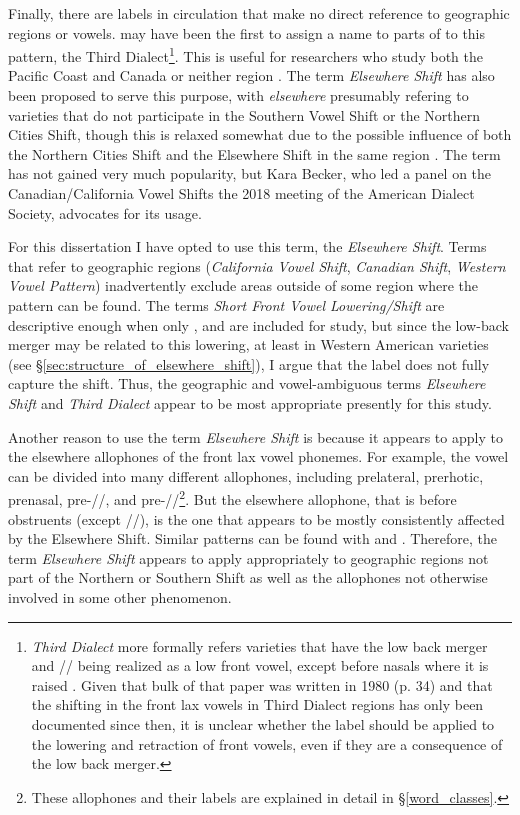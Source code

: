 Finally, there are labels in circulation that make no direct reference to geographic regions or vowels. \citet{labov_1991} may have been the first to assign a name to parts of to this pattern, the Third Dialect\footnote{\textit{Third Dialect} more formally refers varieties that have the low back merger and /\textipa{\ae}/ being realized as a low front vowel, except before nasals where it is raised \citep[30]{labov_1991}. Given that bulk of that paper was written in 1980 (p. 34) and that the shifting in the front lax vowels in Third Dialect regions has only been documented since then, it is unclear whether the label should be applied to the lowering and retraction of front vowels, even if they are a consequence of the low back merger.}. This is useful for researchers who study both the Pacific Coast and Canada \citep{swan_2018} or neither region \citep{durian_2012_diss}. The term \textit{Elsewhere Shift} has also been proposed to serve this purpose, with \textit{elsewhere} presumably refering to varieties that do not participate in the Southern Vowel Shift or the Northern Cities Shift, though this is relaxed somewhat due to the possible influence of both the Northern Cities Shift and the Elsewhere Shift in the same region \citep{mason_2018}. The term has not gained very much popularity, but Kara Becker, who led a panel on the Canadian/California Vowel Shifts the 2018 meeting of the American Dialect Society, advocates for its usage.

For this dissertation I have opted to use this term, the \textit{Elsewhere Shift}. Terms that refer to geographic regions (\textit{California Vowel Shift}, \textit{Canadian Shift}, \textit{Western Vowel Pattern}) inadvertently exclude areas outside of some region where the pattern can be found. The terms \textit{Short Front Vowel Lowering/Shift} are descriptive enough when only \kit, \dress and \trap are included for study, but since the low-back merger may be related to this lowering, at least in Western American varieties (see \S\ref{sec:structure_of_elsewhere_shift}), I argue that the label does not fully capture the shift. Thus, the geographic and vowel-ambiguous terms \textit{Elsewhere Shift} and \textit{Third Dialect} appear to be most appropriate presently for this study.

Another reason to use the term \textit{Elsewhere Shift} is because it appears to apply to the elsewhere allophones of the front lax vowel phonemes. For example, the \trap vowel can be divided into many different allophones, including prelateral, prerhotic, prenasal, pre-//, and pre-//\footnote{These allophones and their labels are explained in detail in \S\ref{word_classes}.}. But the elsewhere allophone, that is \trap before obstruents (except //), is the one that appears to be mostly consistently affected by the Elsewhere Shift. Similar patterns can be found with \dress and \kit. Therefore, the term \textit{Elsewhere Shift} appears to apply appropriately to geographic regions not part of the Northern or Southern Shift as well as the allophones not otherwise involved in some other phenomenon.

